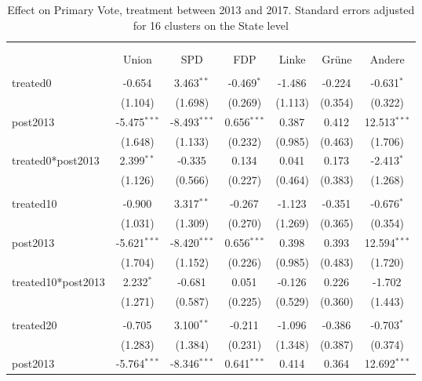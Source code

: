\documentclass[12pt]{article}
\begin{document}
 
\begin{table}[!htbp] \centering
  \caption{Effect on Primary Vote, treatment between 2013 and 2017. Standard errors adjusted for 16 clusters on the State level}
\begin{tabular}{@{\extracolsep{5pt}}lcccccc}
\\[-1.8ex]\hline
\hline \\[-1.8ex]
\\[-1.8ex] & \multicolumn{1}{c}{Union} & \multicolumn{1}{c}{SPD} & \multicolumn{1}{c}{FDP} & \multicolumn{1}{c}{Linke} & \multicolumn{1}{c}{Grüne} & \multicolumn{1}{c}{Andere}  \\
\hline \\[-1.8ex]
 treated0 & -0.654$^{}$ & 3.463$^{**}$ & -0.469$^{*}$ & -1.486$^{}$ & -0.224$^{}$ & -0.631$^{*}$ \\
  & (1.104) & (1.698) & (0.269) & (1.113) & (0.354) & (0.322) \\
 post2013 & -5.475$^{***}$ & -8.493$^{***}$ & 0.656$^{***}$ & 0.387$^{}$ & 0.412$^{}$ & 12.513$^{***}$ \\
  & (1.648) & (1.133) & (0.232) & (0.985) & (0.463) & (1.706) \\
 treated0*post2013 & 2.399$^{**}$ & -0.335$^{}$ & 0.134$^{}$ & 0.041$^{}$ & 0.173$^{}$ & -2.413$^{*}$ \\
  & (1.126) & (0.566) & (0.227) & (0.464) & (0.383) & (1.268) \\
\hline \\[-1.8ex]
 treated10 & -0.900$^{}$ & 3.317$^{**}$ & -0.267$^{}$ & -1.123$^{}$ & -0.351$^{}$ & -0.676$^{*}$ \\
  & (1.031) & (1.309) & (0.270) & (1.269) & (0.365) & (0.354) \\
 post2013 & -5.621$^{***}$ & -8.420$^{***}$ & 0.656$^{***}$ & 0.398$^{}$ & 0.393$^{}$ & 12.594$^{***}$ \\
  & (1.704) & (1.152) & (0.226) & (0.985) & (0.483) & (1.720) \\
 treated10*post2013 & 2.232$^{*}$ & -0.681$^{}$ & 0.051$^{}$ & -0.126$^{}$ & 0.226$^{}$ & -1.702$^{}$ \\
  & (1.271) & (0.587) & (0.225) & (0.529) & (0.360) & (1.443) \\
\hline \\[-1.8ex]
 treated20 & -0.705$^{}$ & 3.100$^{**}$ & -0.211$^{}$ & -1.096$^{}$ & -0.386$^{}$ & -0.703$^{*}$ \\
  & (1.283) & (1.384) & (0.231) & (1.348) & (0.387) & (0.374) \\
 post2013 & -5.764$^{***}$ & -8.346$^{***}$ & 0.641$^{***}$ & 0.414$^{}$ & 0.364$^{}$ & 12.692$^{***}$ \\

\end{tabular}
\end{table}
\end{document}
